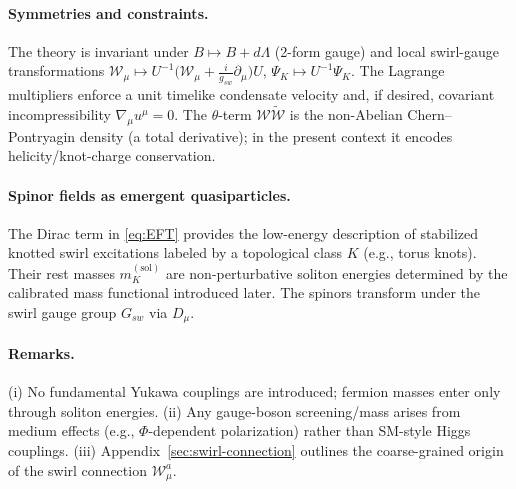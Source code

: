 \documentclass[11pt, preprint,titlepage]{revtex4-2}
\begin{document}
	\paragraph{Symmetries and constraints.}
	The theory is invariant under
	\(B\mapsto B+d\Lambda\) (2-form gauge) and local swirl-gauge transformations
	\(\mathcal{W}_\mu \mapsto U^{-1}\!\big(\mathcal{W}_\mu + \tfrac{i}{g_{\!sw}}\partial_\mu\big)U\),
	\(\Psi_K\mapsto U^{-1}\Psi_K\).
	The Lagrange multipliers enforce a unit timelike condensate velocity and, if desired, covariant incompressibility \(\nabla_\mu u^\mu=0\).
	The \(\theta\)-term \(\mathcal{W}\tilde{\mathcal{W}}\) is the non-Abelian Chern–Pontryagin density (a total derivative); in the present context it encodes helicity/knot-charge conservation.

	\paragraph{Spinor fields as emergent quasiparticles.}
	The Dirac term in \eqref{eq:EFT} provides the low-energy description of stabilized knotted swirl excitations labeled by a topological class \(K\) (e.g., torus knots). Their rest masses \(m_K^{(\mathrm{sol})}\) are non-perturbative soliton energies determined by the calibrated mass functional introduced later. The spinors transform under the swirl gauge group \(G_{\!sw}\) via \(D_\mu\).

	\paragraph{Remarks.}
	(i) No fundamental Yukawa couplings are introduced; fermion masses enter only through soliton energies.
	(ii) Any gauge-boson screening/mass arises from medium effects (e.g., \(\Phi\)-dependent polarization) rather than SM-style Higgs couplings.
	(iii) Appendix~\ref{sec:swirl-connection} outlines the coarse-grained origin of the swirl connection \(\mathcal{W}_\mu^a\).
\end{document}
